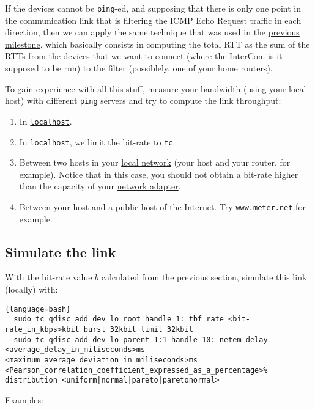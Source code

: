 If the devices cannot be \texttt{ping}-ed, and supposing that there is
only one point in the communication link that is filtering the ICMP
Echo Request traffic in each direction, then we can apply the same
technique that was used in the
\href{https://tecnologias-multimedia.github.io/contents/latency/}{previous
  milestone}, which basically consists in computing the total RTT as
the sum of the RTTs from the devices that we want to connect (where
the InterCom is it supposed to be run) to the filter (possiblely, one
of your home routers).

To gain experience with all this stuff, measure your bandwidth (using
your local host) with different \texttt{ping} servers and try to
compute the link throughput:
\begin{enumerate}
\item In \href{https://en.wikipedia.org/wiki/Localhost}{\texttt{localhost}}.
\item In \texttt{localhost}, we limit the bit-rate to \texttt{tc}.
\item Between two hosts in your
  \href{https://en.wikipedia.org/wiki/Local_area_network}{local
    network} (your host and your router, for example). Notice that in
  this case, you should not obtain a bit-rate higher than the capacity
  of your
  \href{https://en.wikipedia.org/wiki/Network_interface_controller}{network
    adapter}.
\item Between your host and a public host of the Internet. Try
  \href{https://www.meter.net/}{\texttt{www.meter.net}} for example.
\end{enumerate}

\subsection{Simulate the link}
With the bit-rate value $b$ calculated from the previous section, simulate
this link (locally) with:

\begin{lstlisting}{language=bash}
  sudo tc qdisc add dev lo root handle 1: tbf rate <bit-rate_in_kbps>kbit burst 32kbit limit 32kbit
  sudo tc qdisc add dev lo parent 1:1 handle 10: netem delay <average_delay_in_miliseconds>ms <maximum_average_deviation_in_miliseconds>ms <Pearson_correlation_coefficient_expressed_as_a_percentage>% distribution <uniform|normal|pareto|paretonormal>
\end{lstlisting}

Examples:

